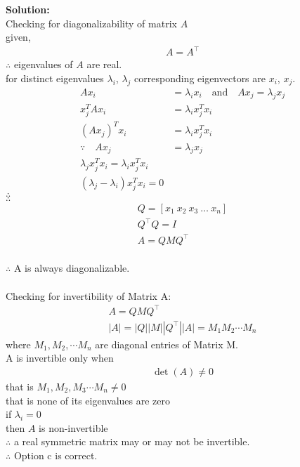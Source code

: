 \documentclass[journal]{IEEEtran}
\begin{document}
\textbf{Solution:}\\
Checking for diagonalizability of matrix $A$ \\
given,
\begin{align}
A = A^\top
\end{align}
$\therefore$ eigenvalues of $A$ are real.\\
for distinct eigenvalues $\lambda_i$, $\lambda_j$ corresponding eigenvectors are $x_i$, $x_j$.
\begin{align}
Ax_i &= \lambda_i x_i \quad \text{and} \quad Ax_j = \lambda_j x_j \\x_j^T A x_i &= \lambda_i x_j^T x_i \\(Ax_j)^T x_i &= \lambda_i x_j^T x_i \\\because \quad Ax_j &= \lambda_j x_j\\
\lambda_j x_j^T x_i = \lambda_i x_j^T x_i\\
(\lambda_j - \lambda_i) x_j^T x_i = 0
\end{align}
$\therefore$ \\
$\therefore$ \\
\begin{align}
Q = [x_1 \ x_2 \ x_3 \ \dots \ x_n] \\
Q^\top Q = I\\
A = Q MQ^\top
\end{align}
\\
$\therefore$ A is always diagonalizable.\\\\
Checking for invertibility of Matrix  A:
\begin{align}
A = Q M Q^\top \\|A| = |Q| |M| |Q^\top|
|A| = M_1 M_2 \cdots M_n
\end{align}
where $M_1, M_2, \cdots M_n$ are diagonal entries of Matrix M.\\
A is invertible only when 
\begin{align}
\det(A) \neq 0 
\end{align}
that is $M_1, M_2, M_3 \cdots M_n \neq 0$ \\
that is none of its eigenvalues are zero \\

if $\lambda_i = 0$ \\
then $A$ is non-invertible \\

$\therefore$ a real symmetric matrix may or may not be invertible.\\
$\therefore$ Option c is correct.
\end{document}
